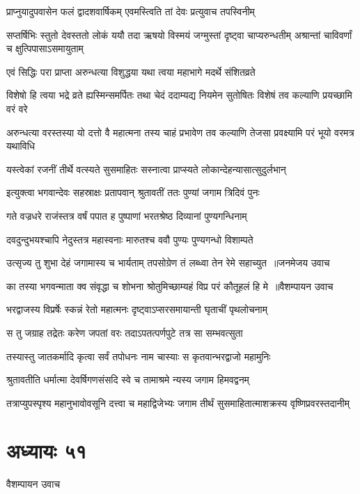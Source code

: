 \twolineshloka
{प्राप्नुयादुपवासेन फलं द्वादशवार्षिकम्}
{एवमस्त्विति तां देवः प्रत्युवाच तपस्विनीम्}


\threelineshloka
{सप्तर्षिभिः स्तुतो देवस्ततो लोकं ययौ तदा}
{ऋषयो विस्मयं जग्मुस्तां दृष्ट्वा चाप्यरुन्धतीम्}
{अश्रान्तां चाविवर्णां च क्षुत्पिपासाऽसमायुताम्}


\twolineshloka
{एवं सिद्धिः परा प्राप्ता अरुन्धत्या विशुद्धया}
{यथा त्वया महाभागे मदर्थे संशितव्रते}


\threelineshloka
{विशेषो हि त्वया भद्रे व्रते ह्यस्मिन्समर्पितः}
{तथा चेदं ददाम्यद्य नियमेन सुतोषितः}
{विशेषं तव कल्याणि प्रयच्छामि वरं वरे}


\threelineshloka
{अरुन्धत्या वरस्तस्या यो दत्तो वै महात्मना}
{तस्य चाहं प्रभावेण तव कल्याणि तेजसा}
{प्रवक्ष्यामि परं भूयो वरमत्र यथाविधि}


\twolineshloka
{यस्त्वेकां रजनीं तीर्थे वत्स्यते सुसमाहितः}
{सस्नात्वा प्राप्स्यते लोकान्देहन्यासात्सुदुर्लभान्}


\twolineshloka
{इत्युक्त्वा भगवान्देवः सहस्राक्षः प्रतापवान्}
{श्रुतावतीं ततः पुण्यां जगाम त्रिदिवं पुनः}


\twolineshloka
{गते वज्रधरे राजंस्तत्र वर्षं पपात ह}
{पुष्पाणां भरतश्रेष्ठ दिव्यानां पुण्यगन्धिनाम्}


\twolineshloka
{दवदुन्दुभयश्चापि नेदुस्तत्र महास्वनाः}
{मारुतश्च ववौ पुण्यः पुण्यगन्धो विशाम्पते}


\threelineshloka
{उत्सृज्य तु शुभा देहं जगामास्य च भार्यताम्}
{तपसोग्रेण तं लब्ध्वा तेन रेमे सहाच्युत ॥जनमेजय उवाच}
{}


\threelineshloka
{का तस्या भगवन्माता क्व संवृद्धा च शोभना}
{श्रोतुमिच्छाम्यहं विप्र परं कौतूहलं हि मे ॥वैशम्पायन उवाच}
{}


\twolineshloka
{भरद्वाजस्य विप्रर्षेः स्कन्नं रेतो महात्मनः}
{दृष्ट्वाऽप्सरसमायान्ती घृताचीं पृथलोचनाम्}


\twolineshloka
{स तु जग्राह तद्रेतः करेण जपतां वरः}
{तदाऽपतत्पर्णपुटे तत्र सा सम्भवत्सुता}


\twolineshloka
{तस्यास्तु जातकर्मादि कृत्वा सर्वं तपोधनः}
{नाम चास्याः स कृतवान्भरद्वाजो महामुनिः}


\twolineshloka
{श्रुतावतीति धर्मात्मा देवर्षिगणसंसदि}
{स्वे च तामाश्रमे न्यस्य जगाम हिमवद्वनम्}


\twolineshloka
{तत्राप्युपस्पृश्य महानुभावोवसूनि दत्त्वा च महाद्विजेभ्यः}
{जगाम तीर्थं सुसमाहितात्माशक्रस्य वृष्णिप्रवरस्तदानीम्}


\chapter{अध्यायः ५१}
\twolineshloka
{वैशम्पायन उवाच}
{}


